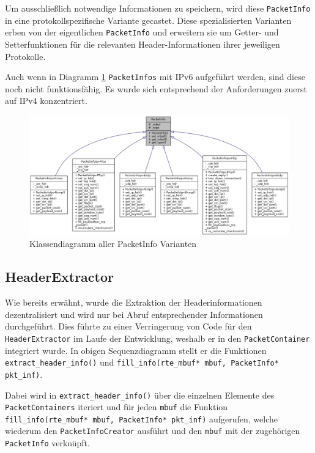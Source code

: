 \documentclass[../review_3.tex]{subfiles}
\begin{document}
Um ausschließlich notwendige Informationen zu speichern, wird diese \texttt{PacketInfo} in eine protokollspezifische Variante gecastet. Diese spezialisierten Varianten erben von der eigentlichen \texttt{PacketInfo} und erweitern sie um Getter- und Setterfunktionen für die relevanten Header-Informationen ihrer jeweiligen Protokolle.

Auch wenn in Diagramm \ref{Klassendiagramm_PacketInfo} \texttt{PacketInfos} mit IPv6 aufgeführt werden, sind diese noch nicht funktionsfähig. Es wurde sich entsprechend der Anforderungen zuerst auf IPv4 konzentriert.

\begin{figure}
    \centering
    \includegraphics[width=\linewidth]{img/PacketInfoInheritance.pdf}
    \caption{Klassendiagramm aller PacketInfo Varianten}
    \label{Klassendiagramm_PacketInfo}
\end{figure}

\subsection{HeaderExtractor}
Wie bereits erwähnt, wurde die Extraktion der Headerinformationen dezentralisiert und wird nur bei Abruf entsprechender Informationen durchgeführt. Dies führte zu einer Verringerung von Code für den \texttt{HeaderExtractor} im Laufe der Entwicklung, weshalb er in den \texttt{PacketContainer} integriert wurde. In obigen Sequenzdiagramm stellt er die Funktionen \texttt{extract\_header\_info()} und \texttt{fill\_info(rte\_mbuf* mbuf, PacketInfo* pkt\_inf)}.

Dabei wird in \texttt{extract\_header\_info()} über die einzelnen Elemente des \texttt{PacketContainers} iteriert und für jeden \texttt{mbuf} die Funktion \texttt{fill\_info(rte\_mbuf* mbuf, PacketInfo* pkt\_inf)} aufgerufen, welche wiederum den \texttt{PacketInfoCreator} ausführt und den \texttt{mbuf} mit der zugehörigen \texttt{PacketInfo} verknüpft.
\end{document}
